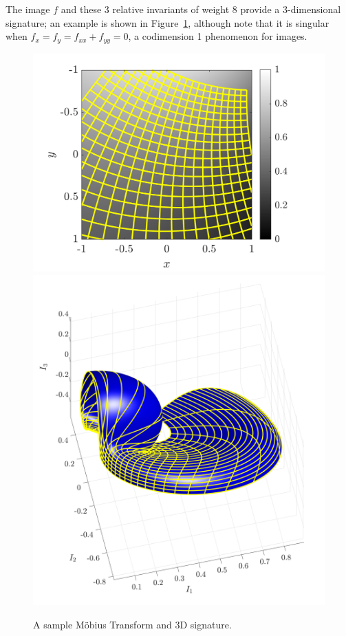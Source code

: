 \documentclass[review,onefignum,onetabnum]{siamonline190516}
\begin{document}
{The image $f$ and these 3 relative invariants of weight 8 provide a 3-dimensional signature; an example is shown in Figure~\ref{fig:mobius}, although note that it is singular when $f_x=f_y=f_{xx}+f_{yy}=0$, a codimension 1 phenomenon for images. 





\begin{figure}
\centering
\includegraphics[width=.45\textwidth]{Figs/f_transformed_Mobius.png}
\includegraphics[width=.45\textwidth]{Figs/Mobius_signature.png}
\caption{A sample M\"obius Transform and 3D signature.}
\label{fig:mobius}
\end{figure}

}
\end{document}

